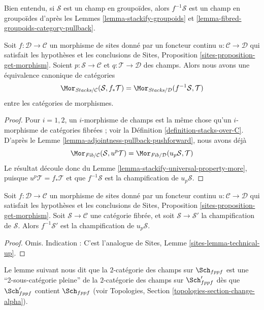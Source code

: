 \noindent
Bien entendu, si $\mathcal{S}$ est un champ en groupoïdes, alors $f^{-1}\mathcal{S}$
est un champ en groupoïdes d'après les
Lemmes \ref{lemma-stackify-groupoids} et
\ref{lemma-fibred-groupoids-category-pullback}.

\begin{lemma}
\label{lemma-adjointness-pullback-pushforward-stacks}
Soit $f : \mathcal{D} \to \mathcal{C}$ un morphisme de sites
donné par un foncteur continu $u : \mathcal{C} \to \mathcal{D}$
qui satisfait les hypothèses et les conclusions de
Sites, Proposition \ref{sites-proposition-get-morphism}.
Soient $p : \mathcal{S} \to \mathcal{C}$ et
$q : \mathcal{T} \to \mathcal{D}$ des champs.
Alors nous avons une équivalence canonique de catégories
$$
\Mor_{\textit{Stacks}/\mathcal{C}}(\mathcal{S}, f_*\mathcal{T})
=
\Mor_{\textit{Stacks}/\mathcal{D}}(f^{-1}\mathcal{S}, \mathcal{T})
$$
entre les catégories de morphismes.
\end{lemma}

\begin{proof}
Pour $i = 1, 2$, un $i$-morphisme de champs est la même chose qu'un
$i$-morphisme de catégories fibrées ; voir la
Définition \ref{definition-stacks-over-C}.
D'après le
Lemme \ref{lemma-adjointness-pullback-pushforward},
nous avons déjà
$$
\Mor_{\textit{Fib}/\mathcal{C}}(\mathcal{S}, u^p\mathcal{T})
=
\Mor_{\textit{Fib}/\mathcal{D}}(u_p\mathcal{S}, \mathcal{T})
$$
Le résultat découle donc du
Lemme \ref{lemma-stackify-universal-property-more},
puisque $u^p\mathcal{T} = f_*\mathcal{T}$ et que $f^{-1}\mathcal{S}$ est la
champification de $u_p\mathcal{S}$.
\end{proof}

\begin{lemma}
\label{lemma-technical-up}
Soit $f : \mathcal{D} \to \mathcal{C}$ un morphisme de sites
donné par un foncteur continu $u : \mathcal{C} \to \mathcal{D}$
qui satisfait les hypothèses et les conclusions de
Sites, Proposition \ref{sites-proposition-get-morphism}.
Soit $\mathcal{S} \to \mathcal{C}$ une catégorie fibrée, et
soit $\mathcal{S} \to \mathcal{S}'$ la champification de $\mathcal{S}$.
Alors $f^{-1}\mathcal{S}'$ est la champification de
$u_p\mathcal{S}$.
\end{lemma}

\begin{proof}
Omis. Indication :
C'est l'analogue de Sites, Lemme \ref{sites-lemma-technical-up}.
\end{proof}

\noindent
Le lemme suivant nous dit que la $2$-catégorie des champs
sur $\Sch_{fppf}$ est une ``2-sous-catégorie pleine'' de la
$2$-catégorie des champs sur $\Sch'_{fppf}$ dès que
$\Sch'_{fppf}$ contient $\Sch_{fppf}$ (voir
Topologies, Section \ref{topologies-section-change-alpha}).

